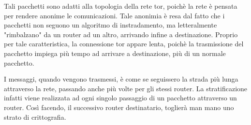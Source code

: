 Tali pacchetti sono adatti alla topologia della rete tor, poichè la rete è pensata per rendere anonime le comunicazioni. Tale anonimia è resa dal fatto che i pacchetti non seguono un algoritmo di instradamento, ma letteralmente "rimbalzano" da un router ad un altro, arrivando infine a destinazione. Proprio per tale caratteristica, la connessione tor appare lenta, poichè la trasmissione del pacchetto impiega più tempo ad arrivare a destinazione, più di un normale pacchetto.

I messaggi, quando vengono trasmessi, è come se seguissero la strada più lunga attraverso la rete, passando anche più volte per gli stessi router. La stratificazione infatti viene realizzata ad ogni singolo passaggio di un pacchetto attraverso un router. Così facendo, il successivo router destinatario, toglierà man mano uno strato di crittografia.
